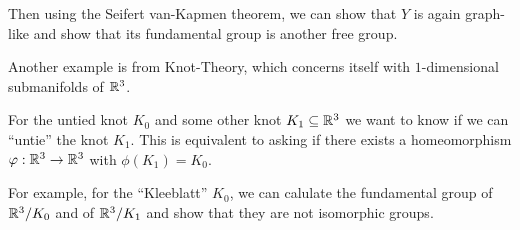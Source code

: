 Then using the Seifert van-Kapmen theorem, we can show that $Y$ is again graph-like and show that its fundamental group is another free group.

Another example is from Knot-Theory, which concerns itself with $1$-dimensional submanifolds of $\mathbb{R}^{3}$.

For the untied knot $K_0$ and some other knot $K_1 \subseteq \mathbb{R}^{3}$ we want to know if we can ``untie'' the knot $K_1$.
This is equivalent to asking if there exists a homeomorphism $\varphi:\mathbb{R}^{3} \to \mathbb{R}^{3}$ with $\phi(K_1) = K_0$.

For example, for the ``Kleeblatt'' $K_0$, we can calulate the fundamental group of $\mathbb{R}^{3}/K_0$ and of $\mathbb{R}^{3}/K_1$ and show that they are not isomorphic groups.


